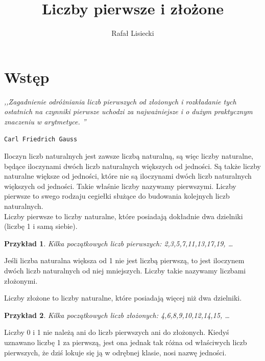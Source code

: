 \documentclass{article}
\author{Rafał Lisiecki}
\title{Liczby pierwsze i złożone}
\begin{document}
\maketitle


\newpage

\newtheorem{example}{Przykład}
\newtheorem{diagram}{Diagram}
\newtheorem{krok}{Krok}
\newtheorem{twierdzenie}{Twierdzenie}

\tableofcontents

\newpage
\section{Wstęp}
\begin{center}
\textit{
,,Zagadnienie odróżniania liczb pierwszych od złożonych i rozkładanie tych ostatnich na czynniki pierwsze uchodzi za najważniejsze i o dużym praktycznym znaczeniu w arytmetyce. ''}
\end{center}
\begin{flushright} \texttt{Carl Friedrich Gauss} \end{flushright}


Iloczyn liczb naturalnych jest zawsze liczbą naturalną, są więc liczby naturalne, będące iloczynami dwóch liczb naturalnych większych od jedności. Są także liczby naturalne większe od jedności, które nie są iloczynami dwóch liczb naturalnych większych od jedności. Takie właśnie liczby nazywamy pierwszymi. Liczby pierwsze to swego rodzaju cegiełki służące do budowania kolejnych liczb naturalnych.
\\
Liczby pierwsze to liczby naturalne, które posiadają dokładnie dwa dzielniki (liczbę 1 i samą siebie).

\begin{example} Kilka początkowych liczb pierwszych: 2,3,5,7,11,13,17,19, \ldots \end{example}

Jeśli liczba naturalna większa od 1 nie jest liczbą pierwszą, to jest iloczynem dwóch liczb naturalnych od niej mniejszych. Liczby takie nazywamy liczbami złożonymi.

Liczby złożone to liczby naturalne, które posiadają więcej niż dwa dzielniki.

\begin{example} Kilka początkowych liczb złożonych: 4,6,8,9,10,12,14,15, \ldots \end{example}

Liczby 0 i 1 nie należą ani do liczb pierwszych ani do złożonych. Kiedyś uznawano liczbę 1 za pierwszą, jest ona jednak tak różna od właściwych liczb pierwszych, że dziś lokuje się ją w odrębnej klasie, nosi nazwę jedności.
\end{document}
